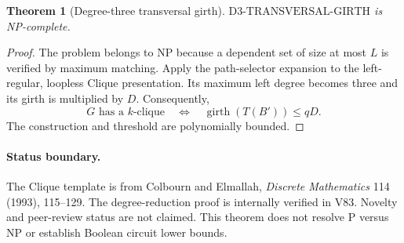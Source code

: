 \documentclass[11pt]{article}
\newtheorem{theorem}{Theorem}
\begin{document}
\begin{theorem}[Degree-three transversal girth]
$\mathrm{D3\text{-}TRANSVERSAL\text{-}GIRTH}$ is NP-complete.
\end{theorem}
\begin{proof}
The problem belongs to NP because a dependent set of size at most $L$ is
verified by maximum matching. Apply the path-selector expansion to the
left-regular, loopless Clique presentation. Its maximum left degree becomes
three and its girth is multiplied by $D$. Consequently,
\[
 G\text{ has a }k\text{-clique}
 \quad\Longleftrightarrow\quad
 \operatorname{girth}(T(B'))\leq qD.
\]
The construction and threshold are polynomially bounded.
\end{proof}

\paragraph{Status boundary.}
The Clique template is from Colbourn and Elmallah, \emph{Discrete
Mathematics} 114 (1993), 115--129. The degree-reduction proof is internally
verified in V83. Novelty and peer-review status are not claimed. This theorem
does not resolve P versus NP or establish Boolean circuit lower bounds.
\end{document}
